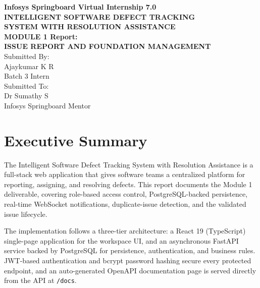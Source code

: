 \documentclass[11pt]{article}
\begin{document}
\begin{titlepage}
\thispagestyle{empty}
\begin{center}
\vspace*{3.5cm}

{\Large\bfseries\color{infosysblue} Infosys Springboard Virtual Internship 7.0}\\[2.5cm]

{\LARGE\bfseries\color{black} INTELLIGENT SOFTWARE DEFECT TRACKING}\\[0.35cm]
{\LARGE\bfseries\color{black} SYSTEM WITH RESOLUTION ASSISTANCE}\\[2.5cm]

{\large\bfseries\color{black} MODULE 1 Report:}\\[0.25cm]
{\large\bfseries\color{black} ISSUE REPORT AND FOUNDATION MANAGEMENT}\\[4cm]

{\large\color{black} Submitted By:\\[0.2cm]
Ajaykumar K R\\[0.2cm]
Batch 3 Intern}\\[2.2cm]

{\large\color{black} Submitted To:\\[0.2cm]
Dr Sumathy S\\[0.2cm]
Infosys Springboard Mentor}

\vfill
\end{center}
\end{titlepage}

\setcounter{page}{1}

\section{Executive Summary}

The Intelligent Software Defect Tracking System with Resolution Assistance is a full-stack web application that gives software teams a centralized platform for reporting, assigning, and resolving defects. This report documents the Module 1 deliverable, covering role-based access control, PostgreSQL-backed persistence, real-time WebSocket notifications, duplicate-issue detection, and the validated issue lifecycle.

The implementation follows a three-tier architecture: a React 19 (TypeScript) single-page application for the workspace UI, and an asynchronous FastAPI service backed by PostgreSQL for persistence, authentication, and business rules. JWT-based authentication and bcrypt password hashing secure every protected endpoint, and an auto-generated OpenAPI documentation page is served directly from the API at \texttt{/docs}.
\end{document}
